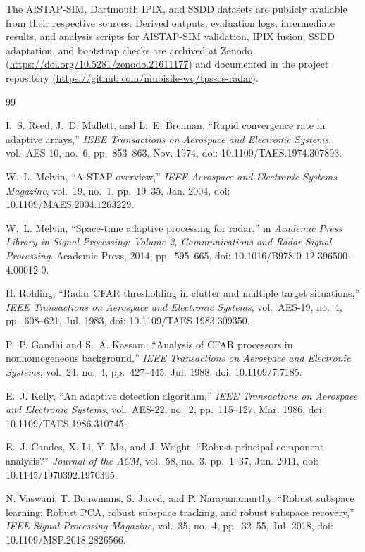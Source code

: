 \documentclass[journal]{IEEEtran}
\begin{document}
The AISTAP-SIM, Dartmouth IPIX, and SSDD datasets are publicly available from their respective sources. Derived outputs, evaluation logs, intermediate results, and analysis scripts for AISTAP-SIM validation, IPIX fusion, SSDD adaptation, and bootstrap checks are archived at Zenodo (\url{https://doi.org/10.5281/zenodo.21611177}) and documented in the project repository (\url{https://github.com/niubisile-wq/tpsscs-radar}).
\begingroup
\fontsize{7.3}{8.2}\selectfont
\enlargethispage{3\baselineskip}
\begin{thebibliography}{99}

I.~S. Reed, J.~D. Mallett, and L.~E. Brennan, ``Rapid convergence rate in adaptive arrays,'' \emph{IEEE Transactions on Aerospace and Electronic Systems}, vol.~AES-10, no.~6, pp.~853--863, Nov. 1974, doi: 10.1109/TAES.1974.307893.

W.~L. Melvin, ``A STAP overview,'' \emph{IEEE Aerospace and Electronic Systems Magazine}, vol.~19, no.~1, pp.~19--35, Jan. 2004, doi: 10.1109/MAES.2004.1263229.

W.~L. Melvin, ``Space-time adaptive processing for radar,'' in \emph{Academic Press Library in Signal Processing: Volume 2, Communications and Radar Signal Processing}. Academic Press, 2014, pp.~595--665, doi: 10.1016/B978-0-12-396500-4.00012-0.

H. Rohling, ``Radar CFAR thresholding in clutter and multiple target situations,'' \emph{IEEE Transactions on Aerospace and Electronic Systems}, vol.~AES-19, no.~4, pp.~608--621, Jul. 1983, doi: 10.1109/TAES.1983.309350.

P.~P. Gandhi and S.~A. Kassam, ``Analysis of CFAR processors in nonhomogeneous background,'' \emph{IEEE Transactions on Aerospace and Electronic Systems}, vol.~24, no.~4, pp.~427--445, Jul. 1988, doi: 10.1109/7.7185.

E.~J. Kelly, ``An adaptive detection algorithm,'' \emph{IEEE Transactions on Aerospace and Electronic Systems}, vol.~AES-22, no.~2, pp.~115--127, Mar. 1986, doi: 10.1109/TAES.1986.310745.

E.~J. Candes, X. Li, Y. Ma, and J. Wright, ``Robust principal component analysis?'' \emph{Journal of the ACM}, vol.~58, no.~3, pp.~1--37, Jun. 2011, doi: 10.1145/1970392.1970395.

N. Vaswani, T. Bouwmans, S. Javed, and P. Narayanamurthy, ``Robust subspace learning: Robust PCA, robust subspace tracking, and robust subspace recovery,'' \emph{IEEE Signal Processing Magazine}, vol.~35, no.~4, pp.~32--55, Jul. 2018, doi: 10.1109/MSP.2018.2826566.


\end{thebibliography}
\end{document}
